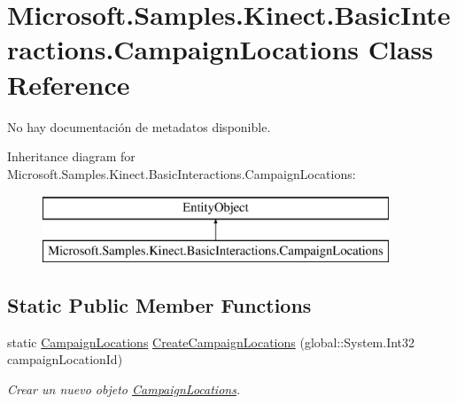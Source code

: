 \hypertarget{class_microsoft_1_1_samples_1_1_kinect_1_1_basic_interactions_1_1_campaign_locations}{\section{Microsoft.\-Samples.\-Kinect.\-Basic\-Interactions.\-Campaign\-Locations Class Reference}
\label{class_microsoft_1_1_samples_1_1_kinect_1_1_basic_interactions_1_1_campaign_locations}
}


No hay documentación de metadatos disponible.  


Inheritance diagram for Microsoft.\-Samples.\-Kinect.\-Basic\-Interactions.\-Campaign\-Locations\-:\begin{figure}[H]
\begin{center}
\leavevmode
\includegraphics[height=2.000000cm]{class_microsoft_1_1_samples_1_1_kinect_1_1_basic_interactions_1_1_campaign_locations}
\end{center}
\end{figure}
\subsection*{Static Public Member Functions}
\begin{DoxyCompactItemize}
\item 
static \hyperlink{class_microsoft_1_1_samples_1_1_kinect_1_1_basic_interactions_1_1_campaign_locations}{Campaign\-Locations} \hyperlink{class_microsoft_1_1_samples_1_1_kinect_1_1_basic_interactions_1_1_campaign_locations_a8970f6c6d6711b778695b715b5f143a0}{Create\-Campaign\-Locations} (global\-::\-System.\-Int32 campaign\-Location\-Id)
\begin{DoxyCompactList}\small\item\em Crear un nuevo objeto \hyperlink{class_microsoft_1_1_samples_1_1_kinect_1_1_basic_interactions_1_1_campaign_locations}{Campaign\-Locations}. \end{DoxyCompactList}\end{DoxyCompactItemize}
